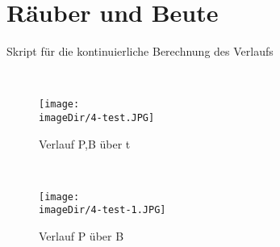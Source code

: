 \section{Räuber und Beute}
\begin{code}
	\caption{Skript für die kontinuierliche Berechnung des Verlaufs}
	\label{source:3-script}
\end{code}
\ \newpage
\begin{figure}[h]
	\centering
	\texttt{[image: \\imageDir/4-test.JPG]}
	\caption{Verlauf P,B über t}
	\label{fig:3-test-1}
\end{figure}
\ \newpage
\begin{figure}[h]
\centering
\texttt{[image: \\imageDir/4-test-1.JPG]}
\caption{Verlauf P über B}
\label{fig:3-test-2}
\end{figure}